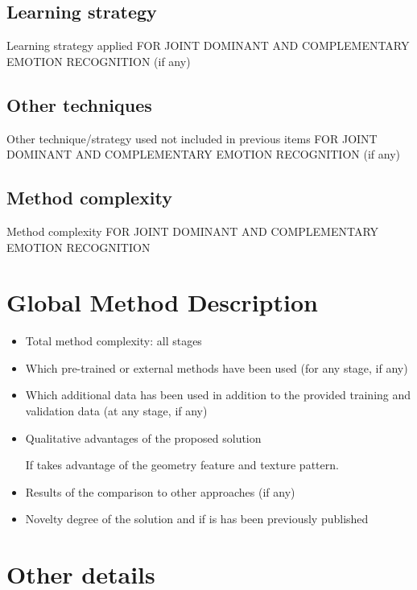 \documentclass{article}
\begin{document}
\subsection{Learning strategy}
Learning strategy applied FOR JOINT DOMINANT AND COMPLEMENTARY EMOTION RECOGNITION (if any)

\subsection{Other techniques}
Other technique/strategy used not included in previous items FOR JOINT DOMINANT AND COMPLEMENTARY EMOTION RECOGNITION (if any)

\subsection{Method complexity}
Method complexity FOR JOINT DOMINANT AND COMPLEMENTARY EMOTION RECOGNITION


\section{Global Method Description}

\begin{itemize}
\item Total method complexity: all stages
\item Which pre-trained or external methods have been used (for any stage, if any)
\item Which additional data has been used in addition to the provided training and validation data (at any stage, if any)
\item Qualitative advantages of the proposed solution

If takes advantage of the geometry feature and texture pattern.
\item Results of the comparison to other approaches (if any)
\item Novelty degree of the solution and if is has been previously published
\end{itemize}

\section{Other details}
\end{document}
